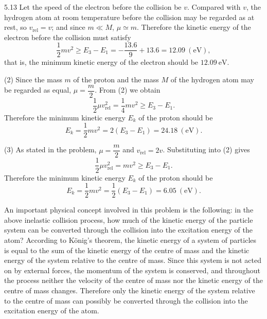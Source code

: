\begin{solution}{5.13}
Let the speed of the electron before the collision be $v$. Compared with $v$, the hydrogen atom
at room temperature before the collision may be regarded as at rest, so
$v_{\text{rel}}=v$; and since $m\ll M$, $\mu\simeq m$. Therefore the kinetic energy of the
electron before the collision must satisfy
\begin{equation*}
\frac{1}{2}mv^2\ge E_3-E_1=-\frac{13.6}{9}+13.6=12.09\ (\mathrm{eV}),
\end{equation*}
that is, the minimum kinetic energy of the electron should be $12.09\ \mathrm{eV}$.

(2) Since the mass $m$ of the proton and the mass $M$ of the hydrogen atom may be regarded as
equal, $\mu=\dfrac{m}{2}$. From (2) we obtain
\begin{equation*}
\frac{1}{2}\mu v_{\text{rel}}^2=\frac{1}{4}mv^2\ge E_3-E_1.
\end{equation*}
Therefore the minimum kinetic energy $E_k$ of the proton should be
\begin{equation*}
E_k=\frac{1}{2}mv^2=2(E_3-E_1)=24.18\ (\mathrm{eV}).
\end{equation*}

(3) As stated in the problem, $\mu=\dfrac{m}{2}$ and $v_{\text{rel}}=2v$. Substituting into (2)
gives
\begin{equation*}
\frac{1}{2}\mu v_{\text{rel}}^2=mv^2\ge E_3-E_1.
\end{equation*}
Therefore the minimum kinetic energy $E_k$ of the proton should be
\begin{equation*}
E_k=\frac{1}{2}mv^2=\frac{1}{2}(E_3-E_1)=6.05\ (\mathrm{eV}).
\end{equation*}

\begin{commentary}
An important physical concept involved in this problem is the following: in the above inelastic
collision process, how much of the kinetic energy of the particle system can be converted
through the collision into the excitation energy of the atom? According to K\"onig's theorem, the
kinetic energy of a system of particles is equal to the sum of the kinetic energy of the centre
of mass and the kinetic energy of the system relative to the centre of mass. Since this system
is not acted on by external forces, the momentum of the system is conserved, and throughout the
process neither the velocity of the centre of mass nor the kinetic energy of the centre of mass
changes. Therefore only the kinetic energy of the system relative to the centre of mass can
possibly be converted through the collision into the excitation energy of the atom.
\end{commentary}
\end{solution}

